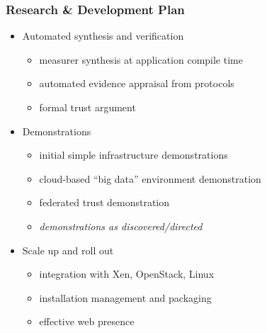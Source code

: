\documentclass{beamer}
\begin{document}
\begin{frame}
  \frametitle{Research \& Development Plan}
  \begin{itemize}
  \item Automated synthesis and verification
    \begin{itemize}
    \item measurer synthesis at application compile time
    \item automated evidence appraisal from protocols
    \item formal trust argument
    \end{itemize}
  \item Demonstrations
    \begin{itemize}
    \item initial simple infrastructure demonstrations
    \item cloud-based ``big data'' environment demonstration
    \item federated trust demonstration
    \item \emph{demonstrations as discovered/directed}
    \end{itemize}
  \item Scale up and roll out
    \begin{itemize}
    \item integration with Xen, OpenStack, Linux
    \item installation management and packaging
    \item effective web presence
    \end{itemize}
  \end{itemize}
\end{frame}
\end{document}
